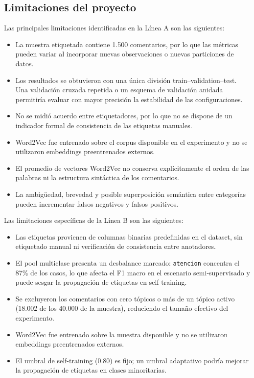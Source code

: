 \documentclass[12pt,a4paper]{article}
\newcommand{\code}[1]{\nolinkurl{#1}}
\begin{document}
\subsection{Limitaciones del proyecto}

Las principales limitaciones identificadas en la Línea A son las siguientes:

\begin{itemize}[leftmargin=*]
    \item La muestra etiquetada contiene 1.500 comentarios, por lo que las métricas pueden variar al incorporar nuevas observaciones o nuevas particiones de datos.
    \item Los resultados se obtuvieron con una única división train--validation--test. Una validación cruzada repetida o un esquema de validación anidada permitiría evaluar con mayor precisión la estabilidad de las configuraciones.
    \item No se midió acuerdo entre etiquetadores, por lo que no se dispone de un indicador formal de consistencia de las etiquetas manuales.
    \item Word2Vec fue entrenado sobre el corpus disponible en el experimento y no se utilizaron embeddings preentrenados externos.
    \item El promedio de vectores Word2Vec no conserva explícitamente el orden de las palabras ni la estructura sintáctica de los comentarios.
    \item La ambigüedad, brevedad y posible superposición semántica entre categorías pueden incrementar falsos negativos y falsos positivos.
\end{itemize}

Las limitaciones específicas de la Línea B son las siguientes:

\begin{itemize}[leftmargin=*]
    \item Las etiquetas provienen de columnas binarias predefinidas en el dataset, sin etiquetado manual ni verificación de consistencia entre anotadores.
    \item El pool multiclase presenta un desbalance marcado: \code{atencion} concentra el 87\% de los casos, lo que afecta el F1 macro en el escenario semi-supervisado y puede sesgar la propagación de etiquetas en self-training.
    \item Se excluyeron los comentarios con cero tópicos o más de un tópico activo (18.002 de los 40.000 de la muestra), reduciendo el tamaño efectivo del experimento.
    \item Word2Vec fue entrenado sobre la muestra disponible y no se utilizaron embeddings preentrenados externos.
    \item El umbral de self-training (0.80) es fijo; un umbral adaptativo podría mejorar la propagación de etiquetas en clases minoritarias.
\end{itemize}
\end{document}
